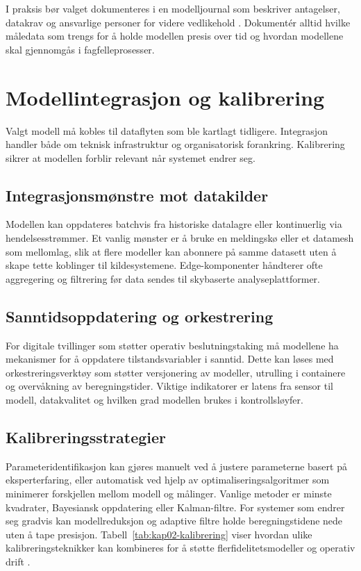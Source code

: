 I praksis bør valget dokumenteres i en modelljournal som beskriver antagelser, datakrav og ansvarlige personer for videre vedlikehold
\citep{iso23247-2021}. Dokumentér alltid hvilke måledata som trengs for å holde modellen presis over tid og hvordan modellene skal
gjennomgås i fagfelleprosesser.

\section{Modellintegrasjon og kalibrering}
Valgt modell må kobles til dataflyten som ble kartlagt tidligere. Integrasjon handler både om teknisk infrastruktur og
organisatorisk forankring. Kalibrering sikrer at modellen forblir relevant når systemet endrer seg.

\subsection{Integrasjonsmønstre mot datakilder}
Modellen kan oppdateres batchvis fra historiske datalagre eller kontinuerlig via hendelsesstrømmer. Et vanlig mønster er å bruke
en meldingskø eller et datamesh som mellomlag, slik at flere modeller kan abonnere på samme datasett uten å skape tette koblinger
til kildesystemene. Edge-komponenter håndterer ofte aggregering og filtrering før data sendes til skybaserte analyseplattformer.

\subsection{Sanntidsoppdatering og orkestrering}
For digitale tvillinger som støtter operativ beslutningstaking må modellene ha mekanismer for å oppdatere tilstandsvariabler i
sanntid. Dette kan løses med orkestreringsverktøy som støtter versjonering av modeller, utrulling i containere og overvåkning av
beregningstider. Viktige indikatorer er latens fra sensor til modell, datakvalitet og hvilken grad modellen brukes i kontrollsløyfer.

\subsection{Kalibreringsstrategier}
Parameteridentifikasjon kan gjøres manuelt ved å justere parameterne basert på eksperterfaring, eller automatisk ved hjelp av
optimaliseringsalgoritmer som minimerer forskjellen mellom modell og målinger. Vanlige metoder er minste kvadrater,
Bayesiansk oppdatering eller Kalman-filtre. For systemer som endrer seg gradvis kan modellreduksjon og adaptive filtre holde
beregningstidene nede uten å tape presisjon. Tabell~\ref{tab:kap02-kalibrering} viser hvordan ulike kalibreringsteknikker kan
kombineres for å støtte flerfidelitetsmodeller og operativ drift \citep{kennedy2000predicting}.

